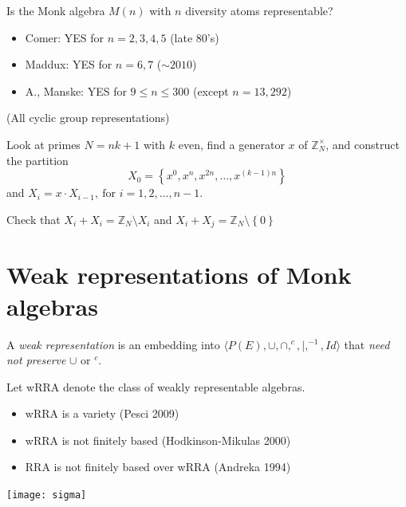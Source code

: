 \documentclass[10pt, handout]{beamer}
\renewcommand{\1}{1^\text{'}}
\newcommand{\0}{0^\text{'}}
\begin{document}

\frame
{
Is the Monk algebra $M(n)$ with $n$ diversity atoms representable?

\pause
\begin{itemize}
  \item Comer: YES for $n=2,3,4,5$ (late 80's)

  \pause
  \item Maddux: YES for $n=6,7$ ($\sim 2010$)

  \pause
  \item A., Manske: YES for $9\leq n\leq 300$ (except $n=13,292$)
\end{itemize}

\pause
(All cyclic group representations)
}

\frame
{Look at primes $N = nk + 1$ with $k$ even, find a generator $x$ of $\mathbb{Z}_{N}^{\times}$, and construct the partition
\[X_{0} = \left\{x^{0},x^{n},x^{2n},\ldots,x^{(k-1)n}\right\}\]
and $X_{i} = x\cdot X_{i-1},\ \text{for $i = 1,2,\ldots,n-1$}$.
\bigskip

\pause

Check that $X_{i}+X_{i}=\mathbb{Z}_{N}\setminus X_{i}$ and $X_{i} + X_{j} = \mathbb{Z}_{N}\setminus \left\{0\right\}$
}



\section{Weak representations of Monk algebras}
\frame
{A \emph{weak representation} is an embedding into $\langle P(E),\cup,\cap,^c,|,^{-1},Id\rangle$ that \emph{need not preserve} $\cup$ or $^c$.

\bigskip

\pause
Let wRRA denote the class of weakly representable algebras.
\begin{itemize}
  \item wRRA is a variety (Pesci 2009)
  \pause
  \item wRRA is not finitely based (Hodkinson-Mikulas 2000)
  \pause
  \item RRA is not finitely based over wRRA (Andreka 1994)
\end{itemize}

}


\frame
{
\begin{center}


\texttt{[image: sigma]}



\end{center}
}
\end{document}
